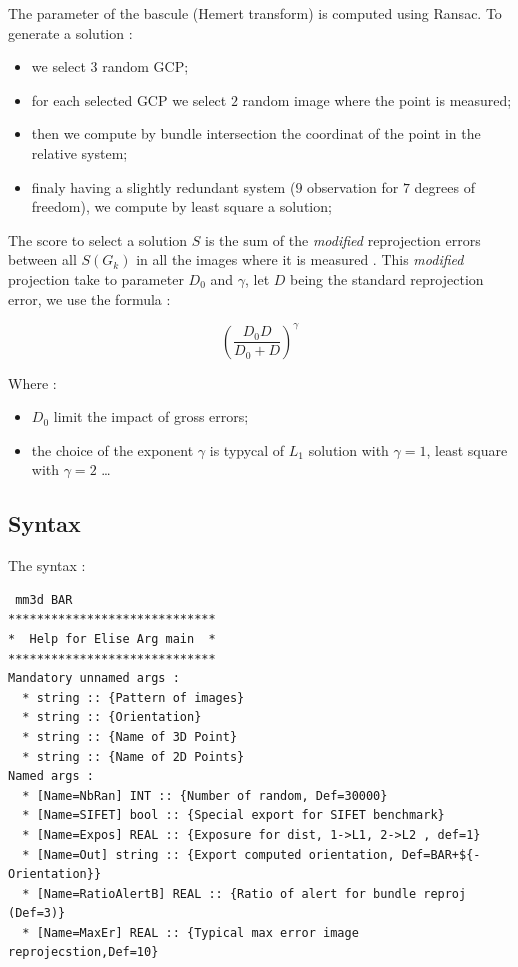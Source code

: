 The  parameter of the bascule (Hemert transform) is computed using Ransac. To generate
a solution :

\begin{itemize}
   \item we select $3$ random GCP;
   \item for each selected GCP we select $2$ random image where the point is measured;
   \item then we compute by bundle intersection the coordinat of the point in the relative system;
   \item finaly having a slightly  redundant system ($9$ observation for $7$ degrees of freedom), we
         compute by least square a solution;
\end{itemize}

The score to select a solution $S$ is the sum of the \emph{modified} reprojection
errors between all $S(G_k)$ in all the images where it is measured  . 
This  \emph{modified} projection take to parameter $D_0$ and $\gamma$, let $D$ being the
standard reprojection error, we use the formula :

\begin{equation}
    (\frac{D_0 D}{D_0 + D}) ^ \gamma \label{Eq:Reproj:Bar}
\end{equation}

Where :

\begin{itemize}
   \item $D_0$ limit the impact of gross errors;
   \item the choice of the exponent $ \gamma$ is typycal of $L_1$ solution with  $ \gamma=1$,
         least square with  $ \gamma=2$ \dots
\end{itemize}


\subsection{Syntax}

The syntax :

\begin{verbatim}
 mm3d BAR 
*****************************
*  Help for Elise Arg main  *
*****************************
Mandatory unnamed args : 
  * string :: {Pattern of images}
  * string :: {Orientation}
  * string :: {Name of 3D Point}
  * string :: {Name of 2D Points}
Named args : 
  * [Name=NbRan] INT :: {Number of random, Def=30000}
  * [Name=SIFET] bool :: {Special export for SIFET benchmark}
  * [Name=Expos] REAL :: {Exposure for dist, 1->L1, 2->L2 , def=1}
  * [Name=Out] string :: {Export computed orientation, Def=BAR+${-Orientation}}
  * [Name=RatioAlertB] REAL :: {Ratio of alert for bundle reproj (Def=3)}
  * [Name=MaxEr] REAL :: {Typical max error image reprojecstion,Def=10}
\end{verbatim}


